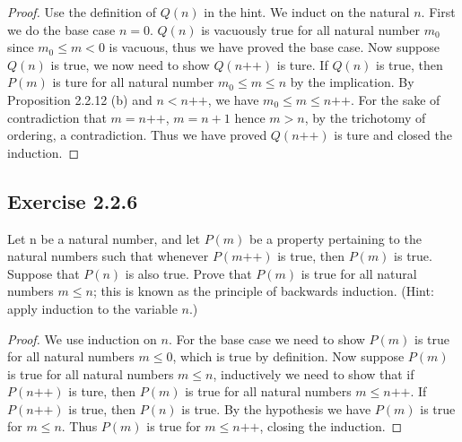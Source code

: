 \documentclass[a4paper]{article}
\begin{document}
\begin{proof}

Use the definition of $Q(n)$ in the hint. We induct on the natural $n$. First we do the base case  $n = 0$. $Q(n)$ is vacuously true for all natural number  $m_0$ since $m_0 \le m < 0$ is vacuous, thus we have proved the base case. Now suppose $Q(n)$ is true, we now need to show $Q(n\text{++})$ is ture. If $Q(n)$ is true, then $P\left( m \right)$ is ture for all natural number $m_0 \le m \le n$ by the implication. By Proposition 2.2.12 (b) and $n < n\text{++}$, we have $m_0 \le m \le n\text{++}$. For the sake of contradiction that $m = n\text{++}$, $m = n + 1$ hence $m > n$, by the trichotomy of ordering, a contradiction. Thus we have proved $Q(n\text{++})$ is ture and closed the induction.

\end{proof}

\subsection*{Exercise 2.2.6}

Let n be a natural number, and let $P(m)$ be a property pertaining to the natural numbers such that whenever $P(m\text{++})$ is true, then $P(m)$ is true. Suppose that $P(n)$ is also true. Prove that $P(m)$ is true for all natural numbers $m \le n$; this is known as the principle of backwards induction. (Hint: apply induction to the variable $n$.)

\begin{proof}

We use induction on $n$. For the base case we need to show  $P(m)$ is true for all natural numbers  $m \le 0$, which is true by definition. Now suppose $P(m)$ is true for all natural numbers  $m \le n$, inductively we need to show that if $P\left( n\text{++} \right) $ is ture, then $P(m)$  is true for all natural numbers $m \le n\text{++}$. If $P(n\text{++})$ is true, then $P(n)$ is true. By the hypothesis we have  $P(m) $ is true for  $m \le n$. Thus $P(m)$ is true for  $m \le n\text{++}$, closing the induction.

\end{proof}
\end{document}
